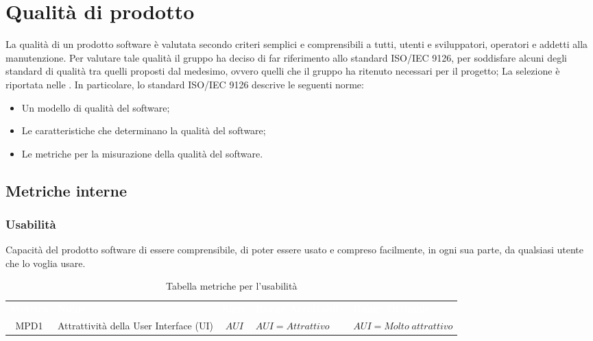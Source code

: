 \section{Qualità di prodotto}
La qualità di un prodotto software è valutata secondo criteri semplici e comprensibili a tutti, utenti e sviluppatori, operatori e addetti alla manutenzione.
Per valutare tale qualità il gruppo \Gruppo{} ha deciso di far riferimento allo standard ISO/IEC 9126, per soddisfare alcuni degli standard di qualità tra quelli proposti dal medesimo, ovvero quelli che il gruppo ha ritenuto necessari per il progetto; La selezione è riportata nelle \NdP{}. In particolare, lo standard ISO/IEC 9126 descrive le seguenti norme:
\begin{itemize}
    \item Un modello di qualità del software; 
    \item Le caratteristiche che determinano la qualità del software;
    \item Le metriche per la misurazione della qualità del software.
\end{itemize}

\subsection{Metriche interne}

\subsubsection{Usabilità} 
Capacità del prodotto software di essere comprensibile, di poter essere usato e compreso facilmente, in ogni sua parte, da qualsiasi utente che lo voglia usare.\\

\renewcommand{\arraystretch}{1.5}
\begin{longtable}{ c C{4cm} c C{3.5cm} C{3.5cm}}
	\caption{Tabella metriche per l'usabilità}\\
	\textcolor{white}{\textbf{Metrica}} & \textcolor{white}{\textbf{Nome}} & \textcolor{white}{\textbf{Sigla}} & \textcolor{white}{\textbf{Range Accettabile}} & \textcolor{white}{\textbf{Range Ottimale}}\\
	MPD1 & Attrattività della User Interface (UI) & $AUI$ & $AUI = Attrattivo$ &  $AUI = Molto \; attrattivo$\\
\end{longtable}
\vspace{0.3cm}
